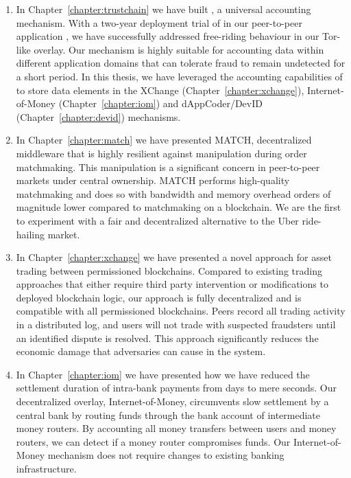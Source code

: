 \begin{enumerate}
	\item In Chapter~\ref{chapter:trustchain} we have built \TrustChain{}, a universal accounting mechanism.
	With a two-year deployment trial of \TrustChain{} in our peer-to-peer application \Tribler{}, we have successfully addressed free-riding behaviour in our Tor-like overlay.
	Our \TrustChain{} mechanism is highly suitable for accounting data within different application domains that can tolerate fraud to remain undetected for a short period.
	In this thesis, we have leveraged the accounting capabilities of \TrustChain{} to store data elements in the XChange (Chapter~\ref{chapter:xchange}), Internet-of-Money (Chapter~\ref{chapter:iom}) and dAppCoder/DevID (Chapter~\ref{chapter:devid}) mechanisms.
	
	\item In Chapter~\ref{chapter:match} we have presented MATCH, decentralized middleware that is highly resilient against manipulation during order matchmaking.
	This manipulation is a significant concern in peer-to-peer markets under central ownership.
	MATCH performs high-quality matchmaking and does so with bandwidth and memory overhead orders of magnitude lower compared to matchmaking on a blockchain.
	We are the first to experiment with a fair and decentralized alternative to the Uber ride-hailing market.
	
	\item In Chapter~\ref{chapter:xchange} we have presented a novel approach for asset trading between permissioned blockchains.
	Compared to existing trading approaches that either require third party intervention or modifications to deployed blockchain logic, our approach is fully decentralized and is compatible with all permissioned blockchains.
	Peers record all trading activity in a distributed log, and users will not trade with suspected fraudsters until an identified dispute is resolved.
	This approach significantly reduces the economic damage that adversaries can cause in the system.
	
	\item In Chapter~\ref{chapter:iom} we have presented how we have reduced the settlement duration of intra-bank payments from days to mere seconds.
	Our decentralized overlay, Internet-of-Money, circumvents slow settlement by a central bank by routing funds through the bank account of intermediate money routers.
	By accounting all money transfers between users and money routers, we can detect if a money router compromises funds.
	Our Internet-of-Money mechanism does not require changes to existing banking infrastructure.
	

\end{enumerate}
